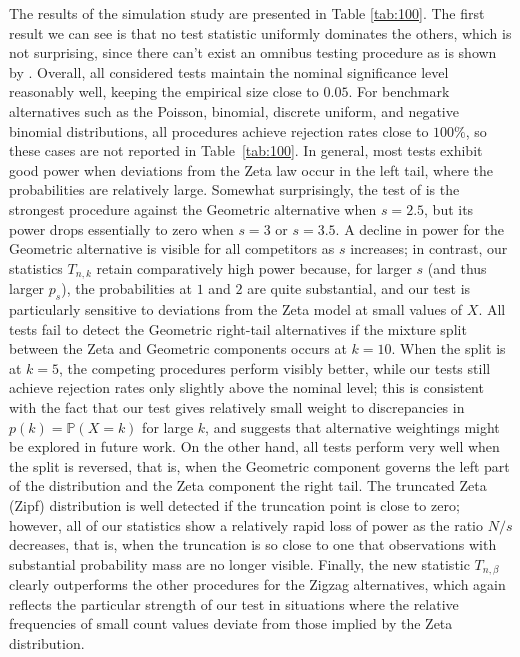 \documentclass{article}
\theoremstyle{thm}
\theoremstyle{def}
\begin{document}
The results of the simulation study are presented in Table \ref{tab:100}. The first result we can see is that no
test statistic uniformly dominates the others, which is not surprising, since there can't exist an omnibus testing procedure as is shown by \cite{J:2000}. Overall, all considered tests maintain the nominal significance level reasonably well, keeping the empirical size close to $0.05$. For benchmark alternatives such as the Poisson, binomial, discrete uniform, and negative binomial distributions, all procedures achieve rejection rates close to $100\%$, so these cases are not reported in Table~\ref{tab:100}. In general, most tests exhibit good power when deviations from the Zeta law occur in the left tail, where the probabilities are relatively large. Somewhat surprisingly, the test of \citet{Yang:2018} is the strongest procedure against the Geometric alternative when $s=2.5$, but its power drops essentially to zero when $s=3$ or $s=3.5$. A decline in power for the Geometric alternative is visible for all competitors as $s$ increases; in contrast, our statistics $T_{n,k}$ retain comparatively high power because, for larger $s$ (and thus larger $p_s$), the probabilities at $1$ and $2$ are quite substantial, and our test is particularly sensitive to deviations from the Zeta model at small values of $X$. All tests fail to detect the Geometric right-tail alternatives if the mixture split between the Zeta and Geometric components occurs at $k=10$. When the split is at $k=5$, the competing procedures perform visibly better, while our tests still achieve rejection rates only slightly above the nominal level; this is consistent with the fact that our test gives relatively small weight to discrepancies in $p(k)=\mathbb P(X=k)$ for large $k$, and suggests that alternative weightings might be explored in future work. On the other hand, all tests perform very well when the split is reversed, that is, when the Geometric component governs the left part of the distribution and the Zeta component the right tail. The truncated Zeta (Zipf) distribution is well detected if the truncation point is close to zero; however, all of our statistics show a relatively rapid loss of power as the ratio $N/s$ decreases, that is, when the truncation is so close to one that observations with substantial probability mass are no longer visible. Finally, the new statistic $T_{n,\beta}$ clearly outperforms the other procedures for the Zigzag alternatives, which again reflects the particular strength of our test in situations where the relative frequencies of small count values deviate from those implied by the Zeta distribution.
\end{document}
